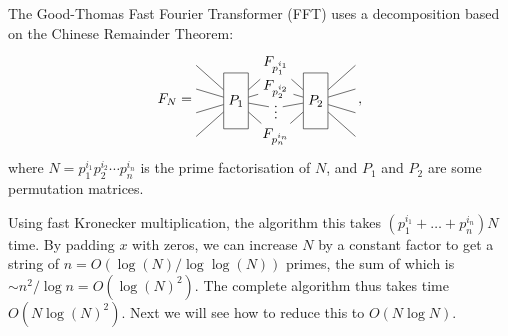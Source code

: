 \documentclass[oneside]{book}
\begin{document}
The Good-Thomas Fast Fourier Transformer (FFT) uses a decomposition based on the Chinese Remainder Theorem:
\[
F_{N} = 
   \begin{tikzpicture}[baseline=-1em, y=1.7em]
      \node[rectangle, draw, minimum height=4em] (P1) at (0,-.5) {$P_1$};
      \node (A) at (1,1) {$F_{p_1^{i_1}}$};
      \node[rectangle, draw, minimum height=4em] (P2) at (2,-.5) {$P_2$};
      \node (B) at (1,0) {$F_{p_2^{i_2}}$};
      \node (C) at (1,-.8) {$\vdots$};
      \node (D) at (1,-2) {$F_{p_n^{i_n}}$};
      \draw (-1,1) -- (P1) -- (A) -- (P2) -- (3, 1);
      \draw (-1,0) -- (P1) -- (B) -- (P2) -- (3, 0);
      \draw (-1,-1) -- (P1) -- (C) -- (P2) -- (3, -1);
      \draw (-1,-2) -- (P1) -- (D) -- (P2) -- (3, -2);
   \end{tikzpicture}
   \,,
\]
where $N = p_1^{i_1} p_2^{i_2} \cdots p_n^{i_n}$ is the prime factorisation of $N$, and $P_1$ and $P_2$ are some permutation matrices.

Using fast Kronecker multiplication, the algorithm this takes $(p_1^{i_1}+\dots+p_n^{i_n}) N$ time.
By padding $x$ with zeros, we can increase $N$ by a constant factor to get a string of $n=O(\log(N)/\log\log(N))$ primes, the sum of which is $\sim n^2/\log n = O(\log(N)^2)$.
The complete algorithm thus takes time $O(N \log(N)^2)$.
Next we will see how to reduce this to $O(N\log N)$.
\end{document}
